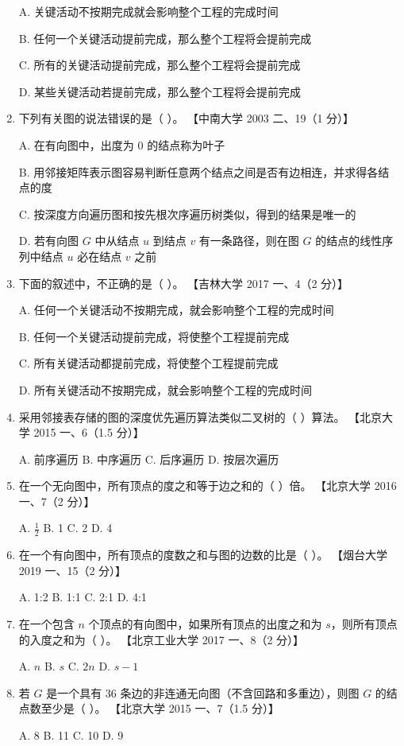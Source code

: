 \documentclass[lang=cn,newtx,10pt,scheme=chinese]{../../elegantbook}
\begin{document}
\begin{enumerate}
    A. 关键活动不按期完成就会影响整个工程的完成时间  

    B. 任何一个关键活动提前完成，那么整个工程将会提前完成  

    C. 所有的关键活动提前完成，那么整个工程将会提前完成  

    D. 某些关键活动若提前完成，那么整个工程将会提前完成  

    \item 下列有关图的说法错误的是（ ）。  
    【中南大学 2003 二、19（1 分）】  

    A. 在有向图中，出度为 0 的结点称为叶子  

    B. 用邻接矩阵表示图容易判断任意两个结点之间是否有边相连，并求得各结点的度  

    C. 按深度方向遍历图和按先根次序遍历树类似，得到的结果是唯一的  

    D. 若有向图 $G$ 中从结点 $u$ 到结点 $v$ 有一条路径，则在图 $G$ 的结点的线性序列中结点 $u$ 必在结点 $v$ 之前  

    \item 下面的叙述中，不正确的是（ ）。  
    【吉林大学 2017 一、4（2 分）】  

    A. 任何一个关键活动不按期完成，就会影响整个工程的完成时间  

    B. 任何一个关键活动提前完成，将使整个工程提前完成  

    C. 所有关键活动都提前完成，将使整个工程提前完成  

    D. 所有关键活动不按期完成，就会影响整个工程的完成时间  

    \item 采用邻接表存储的图的深度优先遍历算法类似二叉树的（ ）算法。  
    【北京大学 2015 一、6（1.5 分）】  

    A. 前序遍历 \quad B. 中序遍历 \quad C. 后序遍历 \quad D. 按层次遍历  

    \item 在一个无向图中，所有顶点的度之和等于边之和的（ ）倍。  
    【北京大学 2016 一、7（2 分）】  

    A. $\frac{1}{2}$ \quad B. 1 \quad C. 2 \quad D. 4  

    \item 在一个有向图中，所有顶点的度数之和与图的边数的比是（ ）。  
    【烟台大学 2019 一、15（2 分）】  

    A. 1:2 \quad B. 1:1 \quad C. 2:1 \quad D. 4:1  

    \item 在一个包含 $n$ 个顶点的有向图中，如果所有顶点的出度之和为 $s$，则所有顶点的入度之和为（ ）。  
    【北京工业大学 2017 一、8（2 分）】  

    A. $n$ \quad B. $s$ \quad C. $2n$ \quad D. $s-1$  

    \item 若 $G$ 是一个具有 36 条边的非连通无向图（不含回路和多重边），则图 $G$ 的结点数至少是（ ）。  
    【北京大学 2015 一、7（1.5 分）】 

    A. 8 \quad B. 11 \quad C. 10 \quad D. 9  
\end{enumerate}
\end{document}
